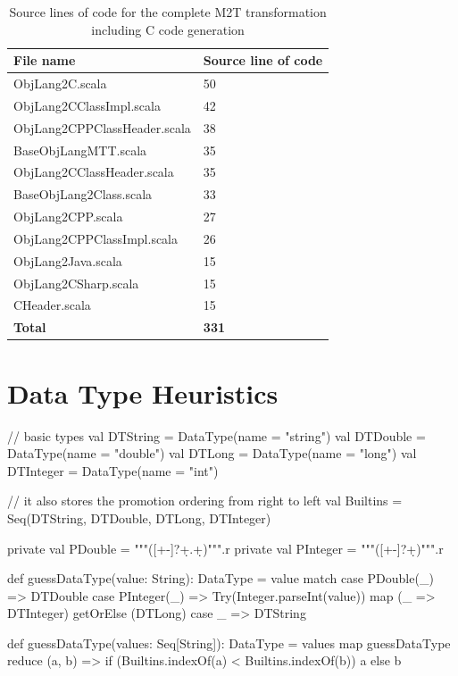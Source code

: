 \begin{table}
	\centering
  \begin{tabular}{l|l}
  \hline
  \textbf{File name}                  & \textbf{Source line of code} \\ \hline
  ObjLang2C.scala              & 50                  \\
  ObjLang2CClassImpl.scala     & 42                  \\
  ObjLang2CPPClassHeader.scala & 38                  \\
  BaseObjLangMTT.scala         & 35                  \\
  ObjLang2CClassHeader.scala   & 35                  \\
  BaseObjLang2Class.scala      & 33                  \\
  ObjLang2CPP.scala            & 27                  \\
  ObjLang2CPPClassImpl.scala   & 26                  \\
  ObjLang2Java.scala           & 15                  \\
  ObjLang2CSharp.scala         & 15                  \\
  CHeader.scala                & 15                  \\ \hline
  \textbf{Total}                        & \textbf{331}                 \\ \hline
  \end{tabular}
  \caption{Source lines of code for the complete M2T transformation including C code generation}
\end{table}


\section{Data Type Heuristics}
\label{sec:AppendixGuessDataType}

\begin{scalacode}
  // basic types
  val DTString = DataType(name = "string")
  val DTDouble = DataType(name = "double")
  val DTLong = DataType(name = "long")
  val DTInteger = DataType(name = "int")

  // it also stores the promotion ordering from right to left
  val Builtins = Seq(DTString, DTDouble, DTLong, DTInteger)

  private val PDouble = """([+-]?\d+.\d+)""".r
  private val PInteger = """([+-]?\d+)""".r

  def guessDataType(value: String): DataType = value match {
    case PDouble(_) => DTDouble
    case PInteger(_) => Try(Integer.parseInt(value)) map (_ => DTInteger) getOrElse (DTLong)
    case _ => DTString
  }

  def guessDataType(values: Seq[String]): DataType =
    values map guessDataType reduce { (a, b) =>
      if (Builtins.indexOf(a) < Builtins.indexOf(b)) a else b
    }
\end{scalacode}


